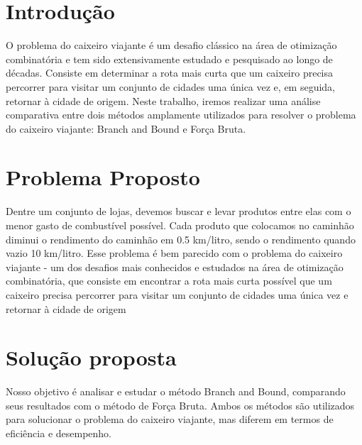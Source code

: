\section{Introdução}
O problema do caixeiro viajante é um desafio clássico na área de otimização combinatória e tem sido extensivamente estudado e pesquisado ao  longo de décadas. Consiste em determinar a rota mais curta que um caixeiro precisa percorrer para visitar um conjunto de cidades uma única vez e, em seguida, retornar à cidade de origem. Neste trabalho, iremos realizar uma análise comparativa entre dois métodos amplamente utilizados para resolver o problema do caixeiro viajante: Branch and Bound e Força Bruta.

\section{Problema Proposto}
Dentre um conjunto de lojas, devemos buscar e levar produtos entre elas com o menor gasto de combustível possível. Cada produto que colocamos no caminhão diminui o rendimento do caminhão em 0.5 km/litro, sendo o rendimento quando vazio 10 km/litro. Esse problema é bem parecido com o problema do caixeiro viajante - um dos desafios mais conhecidos e estudados na área de otimização combinatória, que consiste em encontrar a rota mais curta possível que um caixeiro precisa percorrer para visitar um conjunto de cidades uma única vez e retornar à cidade de origem

\section{Solução proposta}
Nosso objetivo é analisar e estudar o método Branch and Bound, comparando seus resultados com o método de Força Bruta. Ambos os métodos são utilizados para solucionar o problema do caixeiro viajante, mas diferem em termos de eficiência e desempenho.

